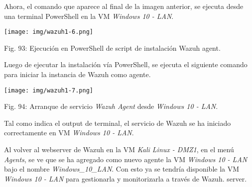\documentclass[12pt,oneside,a4paper]{book}
\begin{document}
\vspace{2em}

\hspace{20pt}
Ahora, el comando que aparece al final de la imagen anterior, se ejecuta desde una terminal PowerShell en la VM \textit{Windows 10 - LAN}.

\vspace{2em}

\begin{center}
    \texttt{[image: img/wazuh1-6.png]}
    
\vspace{0.1em}
    
    Fig. 93: Ejecución en PowerShell de script de instalación Wazuh agent.
\end{center}

\vspace{2em}

\hspace{20pt}
Luego de ejecutar la instalación vía PowerShell, se ejecuta el siguiente comando para iniciar la instancia de Wazuh como agente.

\vspace{2em}

\begin{center}
    \texttt{[image: img/wazuh1-7.png]}
    
\vspace{0.1em}
    
    Fig. 94: Arranque de servicio \textit{Wazuh Agent} desde \textit{Windows 10 - LAN}.
\end{center}

\vspace{2em}

\hspace{20pt}
Tal como indica el output de terminal, el servicio de Wazuh se ha iniciado correctamente en VM \textit{Windows 10 - LAN}.

\vspace{1em}

\hspace{20pt}
Al volver al webserver de Wazuh en la VM \textit{Kali Linux - DMZ1}, en el menú \textit{Agents}, se ve que se ha agregado como nuevo agente la VM \textit{Windows 10 - LAN} bajo el nombre \textit{Windows\_10\_LAN}. Con esto ya se tendría disponible la VM \textit{Windows 10 - LAN} para gestionarla y monitorizarla a través de Wazuh. server.

\vspace{2em}
\end{document}
